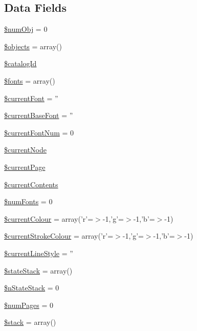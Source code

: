 \subsection*{\-Data \-Fields}
\begin{DoxyCompactItemize}
\item 
\hyperlink{class_cpdf_a46f3313956a33faef75586addfc256a3}{\$num\-Obj} = 0
\item 
\hyperlink{class_cpdf_a255f6b6db4c45b1418e9c15cf4e2bcdd}{\$objects} = array()
\item 
\hyperlink{class_cpdf_ab73b03ba4d8210e1551ba6b4277c4735}{\$catalog\-Id}
\item 
\hyperlink{class_cpdf_ac330cfe6dbddd6c5d814439f97fbaf69}{\$fonts} = array()
\item 
\hyperlink{class_cpdf_a2d5823c32698fc3761bb1254a0282b5e}{\$current\-Font} = ''
\item 
\hyperlink{class_cpdf_afe5d6644791e89099b37ce806592903a}{\$current\-Base\-Font} = ''
\item 
\hyperlink{class_cpdf_a40d5e19fffea92115faffb8a58d5c6d6}{\$current\-Font\-Num} = 0
\item 
\hyperlink{class_cpdf_a640e9f9a022022672baf0926e7b079ef}{\$current\-Node}
\item 
\hyperlink{class_cpdf_af64cef3e8e7fe1dc79ff3293c12fb4cb}{\$current\-Page}
\item 
\hyperlink{class_cpdf_a39303dffdd053136f221e31bb18ccd6b}{\$current\-Contents}
\item 
\hyperlink{class_cpdf_a78cfbb4859f40b0d205596bf7542bc10}{\$num\-Fonts} = 0
\item 
\hyperlink{class_cpdf_a9c9591fc5b60e6bc98bc8898232d4844}{\$current\-Colour} = array('r'=$>$-\/1,'g'=$>$-\/1,'b'=$>$-\/1)
\item 
\hyperlink{class_cpdf_a9320b72ab89c1d8aeb76a607560f85a7}{\$current\-Stroke\-Colour} = array('r'=$>$-\/1,'g'=$>$-\/1,'b'=$>$-\/1)
\item 
\hyperlink{class_cpdf_a6e74a726b7c21bfd7d927955ae767188}{\$current\-Line\-Style} = ''
\item 
\hyperlink{class_cpdf_af19bb712a3b92c4f0fbcdf1add3f0bdd}{\$state\-Stack} = array()
\item 
\hyperlink{class_cpdf_a45de2d60d68c9dcdd4aff475303520f3}{\$n\-State\-Stack} = 0
\item 
\hyperlink{class_cpdf_ab340b7e706b6bd02b4f70ff942898102}{\$num\-Pages} = 0
\item 
\hyperlink{class_cpdf_a6a0169b26b5301f906b1ec481b3f1eea}{\$stack} = array()

\end{DoxyCompactItemize}
